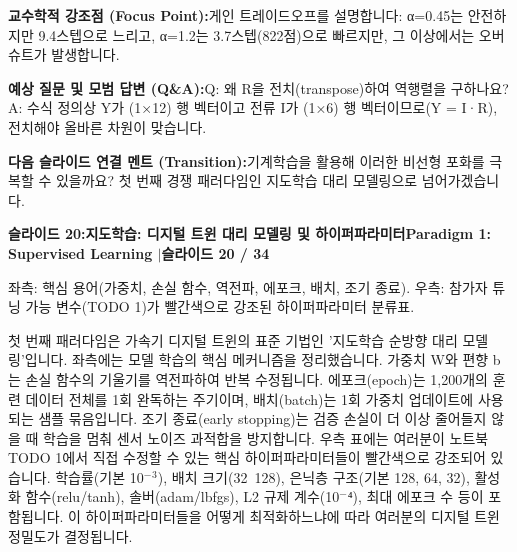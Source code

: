\documentclass[11pt,a4paper]{article}
\begin{document}
\vspace{0.2em}
\begin{tcolorbox}[colback=lightbg,colframe=bordergray,left=6pt,right=6pt,top=3pt,bottom=3pt,boxrule=0.6pt,arc=2.5pt]
\small
\noindent\textbf{\color{navy}교수학적 강조점 (Focus Point):}\enspace 게인 트레이드오프를 설명합니다: α=0.45는 안전하지만 9.4스텝으로 느리고, α=1.2는 3.7스텝(822점)으로 빠르지만, 그 이상에서는 오버슈트가 발생합니다.\par\vspace{0.3em}
\noindent\textbf{\color{successgreen}예상 질문 및 모범 답변 (Q\&A):}\enspace Q: 왜 R을 전치(transpose)하여 역행렬을 구하나요? A: 수식 정의상 Y가 (1×12) 행 벡터이고 전류 I가 (1×6) 행 벡터이므로(Y = I·R), 전치해야 올바른 차원이 맞습니다.\par\vspace{0.3em}
\noindent\textbf{\color{accent}다음 슬라이드 연결 멘트 (Transition):}\enspace 기계학습을 활용해 이러한 비선형 포화를 극복할 수 있을까요? 첫 번째 경쟁 패러다임인 지도학습 대리 모델링으로 넘어가겠습니다.
\end{tcolorbox}
\clearpage
\hypertarget{slide.20}{}
{}
\noindent\begin{tcolorbox}[colback=navy,colframe=navy,left=6pt,right=6pt,top=3pt,bottom=3pt,boxrule=0pt,arc=2pt]
{\large\bfseries\color{white}슬라이드 20:\enspace 지도학습: 디지털 트윈 대리 모델링 및 하이퍼파라미터}\hfill{\footnotesize\bfseries\color{white!85!lightbg}Paradigm 1: Supervised Learning \enspace$|$\enspace 슬라이드 20 / 34}
\end{tcolorbox}
\vspace{0.2em}
\begin{tcolorbox}[colback=lightbg,colframe=bordergray,title={\footnotesize\bfseries\color{darkgray}슬라이드 시각 구성 요약},fontupper=\small,left=6pt,right=6pt,top=2.5pt,bottom=2.5pt,boxrule=0.6pt,arc=2.5pt]
좌측: 핵심 용어(가중치, 손실 함수, 역전파, 에포크, 배치, 조기 종료). 우측: 참가자 튜닝 가능 변수(TODO 1)가 빨간색으로 강조된 하이퍼파라미터 분류표.
\end{tcolorbox}
\vspace{0.2em}
\begin{tcolorbox}[colback=white,colframe=primaryblue,title={\footnotesize\bfseries\color{white}발표자 구두 대본 (Spoken Script)},fontupper=\small,left=6pt,right=6pt,top=3pt,bottom=3pt,boxrule=0.8pt,arc=2.5pt]
첫 번째 패러다임은 가속기 디지털 트윈의 표준 기법인 '지도학습 순방향 대리 모델링'입니다. 좌측에는 모델 학습의 핵심 메커니즘을 정리했습니다. 가중치 W와 편향 b는 손실 함수의 기울기를 역전파하여 반복 수정됩니다. 에포크(epoch)는 1,200개의 훈련 데이터 전체를 1회 완독하는 주기이며, 배치(batch)는 1회 가중치 업데이트에 사용되는 샘플 묶음입니다. 조기 종료(early stopping)는 검증 손실이 더 이상 줄어들지 않을 때 학습을 멈춰 센서 노이즈 과적합을 방지합니다. 우측 표에는 여러분이 노트북 TODO 1에서 직접 수정할 수 있는 핵심 하이퍼파라미터들이 빨간색으로 강조되어 있습니다. 학습률(기본 10$^-$$^3$), 배치 크기(32~128), 은닉층 구조(기본 128, 64, 32), 활성화 함수(relu/tanh), 솔버(adam/lbfgs), L2 규제 계수(10$^-$⁴), 최대 에포크 수 등이 포함됩니다. 이 하이퍼파라미터들을 어떻게 최적화하느냐에 따라 여러분의 디지털 트윈 정밀도가 결정됩니다.
\end{tcolorbox}
\end{document}
